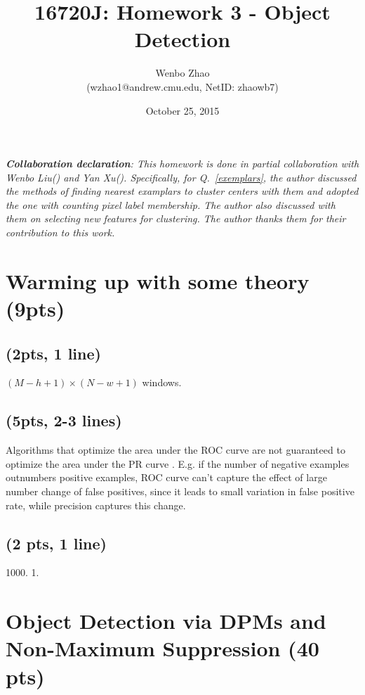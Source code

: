 \documentclass[12pt]{article}
\begin{document}
\title{16720J: Homework 3 - Object Detection}

\author{Wenbo Zhao\\
(wzhao1@andrew.cmu.edu, NetID: zhaowb7)}
\date{October 25, 2015}

\maketitle

\emph{{\bf Collaboration declaration}: This homework is done in partial collaboration with Wenbo Liu() and Yan Xu(). Specifically, for Q.~\ref{exemplars}, the author discussed the methods of finding nearest examplars to cluster centers with them and adopted the one with counting pixel label membership. The author also discussed with them on selecting new features for clustering. The author thanks them for their contribution to this work.}

\section{Warming up with some theory (9pts)}

\renewcommand{\thesubsection}{\bf Question \arabic{section}.\arabic{subsection}}

\subsection{(2pts, 1 line)}
$(M-h+1)\times(N-w+1)$ windows.

\subsection{(5pts, 2-3 lines)}
Algorithms that optimize the area under the ROC curve are not guaranteed to optimize the area under the PR curve \cite{Davis:2006:RPR:1143844.1143874}. E.g. if the number of negative examples outnumbers positive examples, ROC curve can't capture the effect of large number change of false positives, since it leads to small variation in false positive rate, while precision captures this change.
\subsection{(2 pts, 1 line)}
1000. 1. 

\section{Object Detection via DPMs and Non-Maximum Suppression (40 pts)}
\label{dpm}
\end{document}
